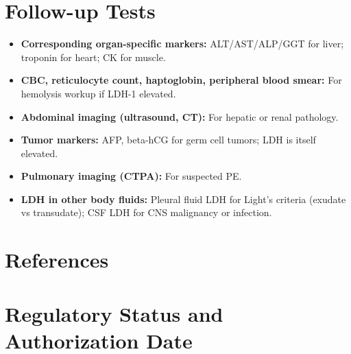 \section*{Follow-up Tests}
\begin{itemize}
  \item \textbf{Corresponding organ-specific markers:} ALT/AST/ALP/GGT for liver; troponin for heart; CK for muscle.
  \item \textbf{CBC, reticulocyte count, haptoglobin, peripheral blood smear:} For hemolysis workup if LDH-1 elevated.
  \item \textbf{Abdominal imaging (ultrasound, CT):} For hepatic or renal pathology.
  \item \textbf{Tumor markers:} AFP, beta-hCG for germ cell tumors; LDH is itself elevated.
  \item \textbf{Pulmonary imaging (CTPA):} For suspected PE.
  \item \textbf{LDH in other body fluids:} Pleural fluid LDH for Light's criteria (exudate vs transudate); CSF LDH for CNS malignancy or infection.
\end{itemize}

\section*{References}



\clearpage
\section*{Regulatory Status and Authorization Date}

\clearpage
